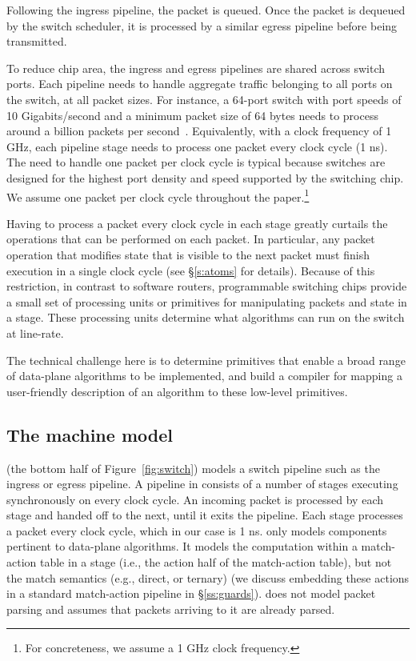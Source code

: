 Following the ingress pipeline, the packet is queued. Once the packet
is dequeued by the switch scheduler, it is processed by a similar
egress pipeline before being transmitted.

To reduce chip area, the ingress and egress pipelines are shared
across switch ports.  Each pipeline needs to handle aggregate traffic
belonging to all ports on the switch, at all packet sizes.  For
instance, a 64-port switch with port speeds of 10 Gigabits/second and
a minimum packet size of 64 bytes needs to process around a billion
packets per second~\cite{rmt}.  Equivalently, with a clock frequency
of 1 GHz, each pipeline stage needs to process one packet every clock
cycle (1 ns).  The need to handle one packet per clock cycle is
typical because switches are designed for the highest port density and
speed supported by the switching chip. We assume one packet per clock
cycle throughout the paper.\footnote{For concreteness, we assume a 1
  GHz clock frequency.}

Having to process a packet every clock cycle in each stage greatly
curtails the operations that can be performed on each packet. In
particular, any packet operation that modifies state that is visible
to the next packet must finish execution in a single clock cycle (see
\S\ref{s:atoms} for details). Because of this restriction, in
contrast to software routers, programmable switching chips provide a
small set of processing units or primitives for manipulating packets
and state in a stage. These processing units determine what algorithms
can run on the switch at line-rate. 

The technical challenge here is to determine primitives that enable a
broad range of data-plane algorithms to be implemented, and build a
compiler for mapping a user-friendly description of an algorithm to
these low-level primitives.
\subsection{The \absmachine machine model}

\absmachine (the bottom half of Figure~\ref{fig:switch}) models a switch
pipeline such as the ingress or egress pipeline. A pipeline in \absmachine
consists of a number of stages executing synchronously on every clock cycle. An
incoming packet is processed by each stage and handed off to the next, until it
exits the pipeline. Each stage processes a packet every clock cycle, which in
our case is 1 ns. \absmachine only models components pertinent to data-plane
algorithms.  It models the computation within a match-action table in a stage
(i.e., the action half of the match-action table), but not the match semantics
(e.g., direct, or ternary) (we discuss embedding these actions in a standard
match-action pipeline in \S\ref{ss:guards}). \absmachine does not model packet
parsing and assumes that packets arriving to it are already parsed.


